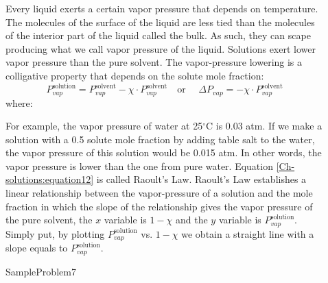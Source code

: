 \documentclass[main.tex]{subfiles}
\newcommand\chapterlabel{Ch-solutions}\setcounter{figurenewcounter}{0}\setcounter{tablenewcounter}{0}\setcounter{formulanewcounter}{0}
\begin{document}
\begin{description}
\item[] 
Every liquid exerts a certain vapor pressure that depends on temperature. The molecules of the surface of the liquid are less tied than the molecules of the interior part of the liquid called the bulk. As such, they can scape producing what we call vapor pressure of the liquid. Solutions exert lower vapor pressure than the pure solvent. The vapor-pressure lowering is a colligative property that depends on the solute mole fraction:
\begin{equation}
\boxed{ P_{vap}^{\text{solution}}=P_{vap}^{\text{solvent}} -  \chi \cdot P_{vap}^{\text{solvent}} 	}
\quad  \text{or }\quad 
\boxed{\Delta P_{vap} =  -  \chi \cdot P_{vap}^{\text{solvent}}  }
\label{\chapterlabel:equation12}
\end{equation}
where:
For example, the vapor pressure of water at 25$^{\circ}$C  is 0.03 atm. If we make a solution with a 0.5 solute mole fraction by adding table salt to the water, the vapor pressure of this solution would be 0.015 atm. In other words, the vapor pressure is lower than the one from pure water.  Equation \ref{\chapterlabel:equation12} is called Raoult's Law.
Raoult's Law establishes a linear relationship between the vapor-pressure of a solution and the mole fraction in which the slope of the relationship gives the vapor pressure of the pure solvent, the $x$ variable is $1-\chi$ and the $y$ variable is $P_{vap}^{\text{solution}}$. Simply put, by plotting $P_{vap}^{\text{solution}}$ vs. $1-\chi$ we obtain a straight line with a slope equals to $P_{vap}^{\text{solution}}$.


{SampleProblem7}




\end{description}
\end{document}
